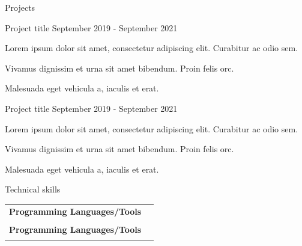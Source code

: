 \documentclass{resume} %
\makeatletter
\newcommand{\entry}[2]{#1 & #2 \tabularnewline} %
\newcommand{\tableEnv}[2]{%
  \begin{rSection}{#1} %
    \begin{adjustwidth}{0.0in}{0.1in} %
      \begin{tabularx}{\linewidth}{@{} >{\bfseries}l @{\hspace{6ex}} X @{}}
        #2 %
      \end{tabularx}
    \end{adjustwidth}
  \end{rSection}
}
\makeatother
\begin{document}
\newpage
\begin{rSection}{Projects}

    \begin{rSubsection}
    {Project title}
    {September 2019 - September 2021}
    {\null\hspace{2pt} \href{www.github.com}{\faGithub} \vline \hspace{2pt} \href{www.website.com}{\faGlobe}}
    {}
    \item Lorem ipsum dolor sit amet, consectetur adipiscing elit. Curabitur ac odio sem.
    \item Vivamus dignissim et urna sit amet bibendum. Proin felis orc.
    \item Malesuada eget vehicula a, iaculis et erat.
    \end{rSubsection}


    \begin{rSubsection}
    {Project title}
    {September 2019 - September 2021}
    {\null\hspace{2pt} \href{www.github.com}{\faGithub} \vline \hspace{2pt} \href{www.website.com}{\faGlobe}}
    {}
    \item Lorem ipsum dolor sit amet, consectetur adipiscing elit. Curabitur ac odio sem.
    \item Vivamus dignissim et urna sit amet bibendum. Proin felis orc.
    \item Malesuada eget vehicula a, iaculis et erat.
    \end{rSubsection}
\end{rSection}


\tableEnv{Technical skills}{
    \entry{Programming Languages/Tools}
    {   
        \raggedright
        \ovalbox{C}
        \ovalbox{C++}
        \ovalbox{Java}
        \ovalbox{Javascript}
        \ovalbox{Prolog}
        \ovalbox{\LaTeX}
        \ovalbox{PigeonScript}
    }
    \entry{}{\vspace{1em}}
    
    \entry{Programming Languages/Tools}
    {   
        \raggedright
        \ovalbox{C}
        \ovalbox{C++}
        \ovalbox{Java}
        \ovalbox{Javascript}
        \ovalbox{Prolog}
        \ovalbox{\LaTeX}
        \ovalbox{PigeonScript}
    }
    \entry{}{\vspace{1em}}
}
\end{document}
